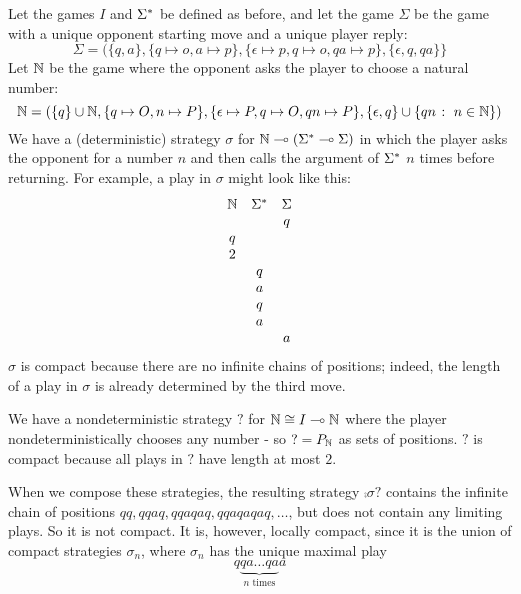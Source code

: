 \documentclass{article}
\begin{document}
\begin{example}
  Let the games $I$ and ${\Sigma^*}$ be defined as before, and let the game $\Sigma$ be the game with a unique opponent starting move and a unique player reply:
  \[
    \Sigma = (\{q,a\}, \{q\mapsto o, a\mapsto p\}, \{\epsilon\mapsto p,q\mapsto o,qa\mapsto p\}, \{\epsilon, q, qa\}\}
    \]
  Let $\mathbb{N}$ be the game where the opponent asks the player to choose a natural number:
  \[
    \mathbb{N} = \left(\{q\} \cup \mathbb{N}, \{q\mapsto O, n\mapsto P\}, \{\epsilon\mapsto P,q\mapsto O,qn\mapsto P\}, \{\epsilon, q\} \cup \{qn\;\colon\; n\in\mathbb{N}\}\right)
    \]
  We have a (deterministic) strategy $\sigma$ for $\mathbb{N}\multimap ({\Sigma^*}\multimap\Sigma)$ in which the player asks the opponent for a number $n$ and then calls the argument of ${\Sigma^*}$ $n$ times before returning.  For example, a play in $\sigma$ might look like this:
  \[
    \begin{array}{ccc}
      \mathbb{N} & {\Sigma^*} & \Sigma \\
      & & q \\
      q & & \\
      2 & & \\
      & q & \\
      & a & \\
      & q & \\
      & a & \\
      & & a
    \end{array}
    \]
  $\sigma$ is compact because there are no infinite chains of positions; indeed, the length of a play in $\sigma$ is already determined by the third move.  

  We have a nondeterministic strategy $?$ for $\mathbb{N}\cong I\multimap\mathbb{N}$ where the player nondeterministically chooses any number - so $? = P_{\mathbb{N}}$ as sets of positions.  $?$ is compact because all plays in $?$ have length at most $2$.  

  When we compose these strategies, the resulting strategy $\comp\sigma?$ contains the infinite chain of positions $qq,qqaq,qqaqaq,qqaqaqaq,\dots$, but does not contain any limiting plays.  So it is not compact.  It is, however, locally compact, since it is the union of compact strategies $\sigma_n$, where $\sigma_n$ has the unique maximal play
  \[
    q\underbrace{qa\dots qa}_{\textrm{$n$ times}}a
    \]
\end{example}
\end{document}
